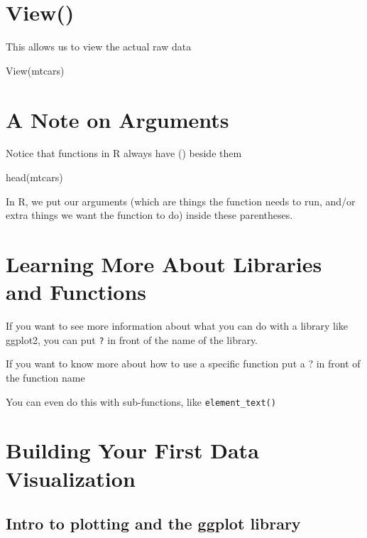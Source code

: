 \documentclass[
]{book}
\newenvironment{Shaded}{\begin{snugshade}}{\end{snugshade}}
\newcommand{\FunctionTok}[1]{\textcolor[rgb]{0.00,0.00,0.00}{#1}}
\newcommand{\NormalTok}[1]{#1}
\begin{document}
\hypertarget{view}{%
\section{View()}\label{view}}

This allows us to view the actual raw data

\begin{Shaded}
\begin{Highlighting}[]
\FunctionTok{View}\NormalTok{(mtcars)}
\end{Highlighting}
\end{Shaded}

\hypertarget{a-note-on-arguments}{%
\section{A Note on Arguments}\label{a-note-on-arguments}}

Notice that functions in R always have () beside them

head(mtcars)

In R, we put our arguments (which are things the function needs to run, and/or extra things we want the function to do) inside these parentheses.

\hypertarget{learning-more-about-libraries-and-functions}{%
\section{Learning More About Libraries and Functions}\label{learning-more-about-libraries-and-functions}}

If you want to see more information about what you can do with a library like ggplot2, you can put \texttt{?} in front of the name of the library.

If you want to know more about how to use a specific function put a ? in front of the function name

You can even do this with sub-functions, like \texttt{element\_text()}

\hypertarget{building-your-first-data-visualization}{%
\section{Building Your First Data Visualization}\label{building-your-first-data-visualization}}

\hypertarget{intro-to-plotting-and-the-ggplot-library}{%
\subsection{Intro to plotting and the ggplot library}\label{intro-to-plotting-and-the-ggplot-library}}
\end{document}
